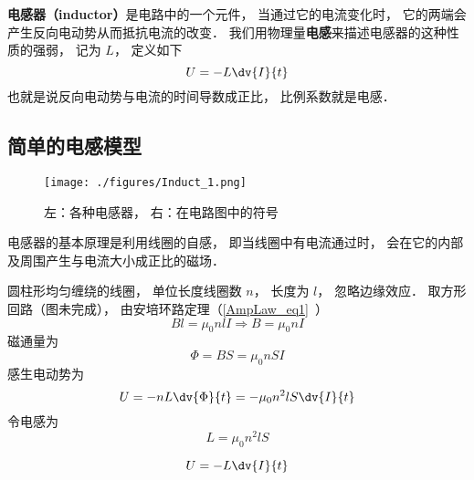 

\textbf{电感器（inductor）}是电路中的一个元件， 当通过它的电流变化时， 它的两端会产生反向电动势从而抵抗电流的改变． 我们用物理量\textbf{电感}来描述电感器的这种性质的强弱， 记为 $L$， 定义如下
\begin{equation}
U = -L\dv{I}{t}
\end{equation}
也就是说反向电动势与电流的时间导数成正比， 比例系数就是电感．

\subsection{简单的电感模型}

\begin{figure}[ht]
\centering
\texttt{[image: ./figures/Induct\_1.png]}
\caption{左：各种电感器， 右：在电路图中的符号} \label{Induct_fig1}
\end{figure}
电感器的基本原理是利用线圈的自感， 即当线圈中有电流通过时， 会在它的内部及周围产生与电流大小成正比的磁场．

圆柱形均匀缠绕的线圈， 单位长度线圈数 $n$， 长度为 $l$， 忽略边缘效应． 取方形回路（图未完成）， 由安培环路定理（\autoref{AmpLaw_eq1}~）
\begin{equation}
Bl = \mu_0nlI \Rightarrow B = \mu_0nI
\end{equation}
磁通量为
\begin{equation}
\Phi = BS = \mu_0nSI
\end{equation}
感生电动势为
\begin{equation}
U = -nL\dv{\Phi}{t} = -\mu_0n^2lS \dv{I}{t}
\end{equation}
令电感为
\begin{equation}
L = \mu_0n^2lS
\end{equation}

\begin{equation}
U = -L\dv{I}{t}
\end{equation}
